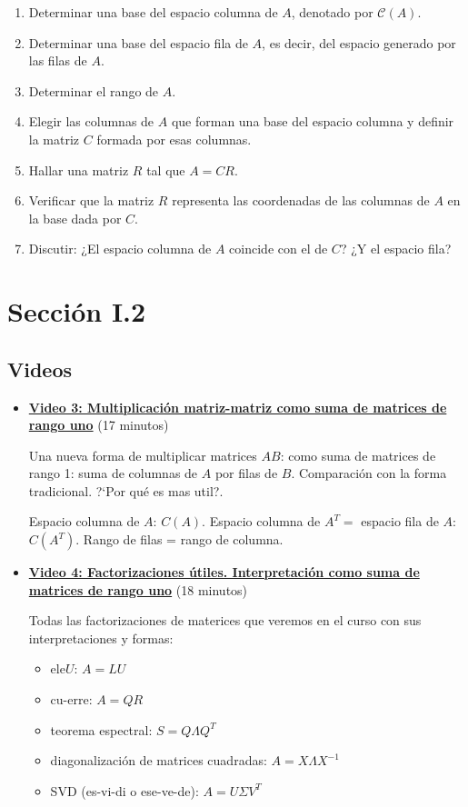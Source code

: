 \documentclass[12pt,a4paper]{article}
\newcommand\1{\mbox{\,\vrule height-0.8pt depth1.0pt width2pc\,}}
\newcommand\2{\mbox{\,\vrule height-0.8pt depth1.0pt width1pc\,}}
\begin{document}
\begin{enumerate}
    \item Determinar una base del espacio columna de \( A \), denotado por \( \mathcal{C}(A) \).
    \item Determinar una base del espacio fila de \( A \), es decir, del espacio generado por las filas de \( A \).
    \item Determinar el rango de \( A \).
    \item Elegir las columnas de \( A \) que forman una base del espacio columna y definir la matriz \( C \) formada por esas columnas.
    \item Hallar una matriz \( R \) tal que \( A = C R \).
    \item Verificar que la matriz \( R \) representa las coordenadas de las columnas de \( A \) en la base dada por \( C \).
    \item Discutir: ¿El espacio columna de \( A \) coincide con el de \( C \)? ¿Y el espacio fila?
\end{enumerate}


\section{Sección I.2}

\subsection*{Videos}

\begin{itemize}
\item \href{https://youtu.be/Rsk_sYM_C6g}{\bf Video 3: Multiplicación matriz-matriz como suma de matrices de rango uno} (17 minutos)

Una nueva forma de multiplicar matrices $AB$: como suma de matrices de rango 1: suma de columnas de $A$
por filas de $B$. Comparaci\'on con la forma tradicional. ?`Por qu\'e es mas util?. 

Espacio columna de $A$: $C(A)$. Espacio columna de $A^T= $ espacio fila de $A$: $C(A^T)$. Rango de filas = rango de columna.






\item \href{https://youtu.be/Iq0QD9kXz_8}{\bf Video 4: Factorizaciones útiles. Interpretación como suma de matrices de rango uno} (18 minutos)

Todas las factorizaciones de materices  que veremos en el curso con sus interpretaciones y formas:

\begin{itemize}
    \item ele$U$: $A=LU$
    \item cu-erre: $A=QR$
    \item teorema espectral: $S=Q \Lambda Q^T$
    \item diagonalizaci\'on de matrices cuadradas: $A=X \Lambda X^{-1}$
    \item SVD (es-vi-di o ese-ve-de): $A=U\Sigma V^T$
\end{itemize}

\end{itemize}
\end{document}

